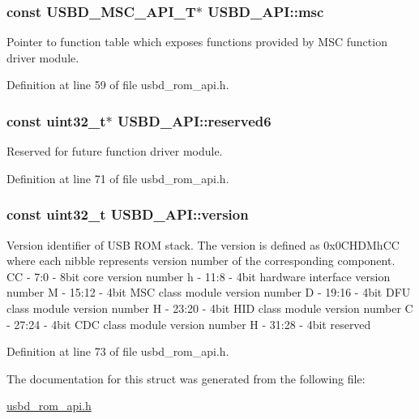 \subsubsection[{\texorpdfstring{msc}{msc}}]{\setlength{\rightskip}{0pt plus 5cm}const {\bf U\+S\+B\+D\+\_\+\+M\+S\+C\+\_\+\+A\+P\+I\+\_\+T}$\ast$ U\+S\+B\+D\+\_\+\+A\+P\+I\+::msc}\hypertarget{structUSBD__API_a0a7fefe527769345f3565fba289c8358}{}\label{structUSBD__API_a0a7fefe527769345f3565fba289c8358}
Pointer to function table which exposes functions provided by M\+SC function driver module. 

Definition at line 59 of file usbd\+\_\+rom\+\_\+api.\+h.

\subsubsection[{\texorpdfstring{reserved6}{reserved6}}]{\setlength{\rightskip}{0pt plus 5cm}const uint32\+\_\+t$\ast$ U\+S\+B\+D\+\_\+\+A\+P\+I\+::reserved6}\hypertarget{structUSBD__API_a4761deeab24d9655d4ab471dee37fe9a}{}\label{structUSBD__API_a4761deeab24d9655d4ab471dee37fe9a}
Reserved for future function driver module. 

Definition at line 71 of file usbd\+\_\+rom\+\_\+api.\+h.

\subsubsection[{\texorpdfstring{version}{version}}]{\setlength{\rightskip}{0pt plus 5cm}const uint32\+\_\+t U\+S\+B\+D\+\_\+\+A\+P\+I\+::version}\hypertarget{structUSBD__API_a900209612d9df086dd044b630607955b}{}\label{structUSBD__API_a900209612d9df086dd044b630607955b}
Version identifier of U\+SB R\+OM stack. The version is defined as 0x0\+C\+H\+D\+Mh\+CC where each nibble represents version number of the corresponding component. CC -\/ 7\+:0 -\/ 8bit core version number h -\/ 11\+:8 -\/ 4bit hardware interface version number M -\/ 15\+:12 -\/ 4bit M\+SC class module version number D -\/ 19\+:16 -\/ 4bit D\+FU class module version number H -\/ 23\+:20 -\/ 4bit H\+ID class module version number C -\/ 27\+:24 -\/ 4bit C\+DC class module version number H -\/ 31\+:28 -\/ 4bit reserved 

Definition at line 73 of file usbd\+\_\+rom\+\_\+api.\+h.



The documentation for this struct was generated from the following file\+:\begin{DoxyCompactItemize}
\item 
\hyperlink{usbd__rom__api_8h}{usbd\+\_\+rom\+\_\+api.\+h}\end{DoxyCompactItemize}

